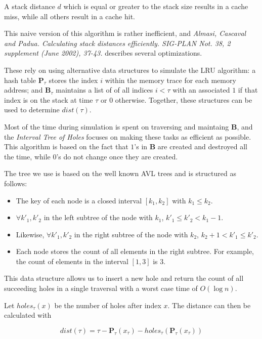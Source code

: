 \documentclass[a4paper,10pt]{article}
\begin{document}
A stack distance $d$ which is equal or greater to the stack size results
in a cache miss, while all others result in a cache hit.

This naive version of this algorithm is rather inefficient, and \emph{Almasi, Cascaval and Padua. Calculating stack distances efficiently. SIG-PLAN Not. 38, 2 supplement (June 2002), 37-43.} describes several optimizations.

These rely on using alternative data structures to simulate the LRU algorithm: a hash table $\mathbf{P}_\tau$ stores the index $i$ within the memory trace for each memory address; and $\mathbf{B}_\tau$ maintains a list of
of all indices $i < \tau$ with an associated $1$ if that index is on the stack at time $\tau$ or $0$ otherwise. Together, these structures can
be used to  determine $dist(\tau)$.

Most of the time during simulation is spent on traversing and maintaing $\mathbf{B}$, and the \emph{Interval Tree of Holes} focuses on making these tasks as efficient as possible. This algorithm is based on the fact that
$1$'s in $\mathbf{B}$ are created and destroyed all the time, while $0$'s
do not change once they are created.

The tree we use is based on the well known AVL trees and is structured
as follows:

\begin{itemize}
\item The key of each node is a closed interval $[k_1, k_2]$ with
      $k_1 \leq k_2$.
\item $\forall k'_1, k'_2$ in the left subtree of the node with $k_1$,          $k'_1 \leq k'_2 < k_1 - 1$.
\item Likewise, $\forall k'_1, k'_2$ in the right subtree of the node with $k_2$, $k_2 + 1 < k'_1 \leq k'_2$.
\item Each node stores the count of all elements
      in the right subtree. For example, the count of elements in the
      interval $[1, 3]$ is $3$.
\end{itemize}

This data structure allows us to insert a new hole and return the count
of all succeeding holes in a single traversal with a worst case
time of $O(\log n)$.

Let $holes_\tau(x)$ be the number of holes after index $x$. The distance
can then be calculated with

\begin{displaymath}
dist(\tau) = \tau - \mathbf{P}_\tau(x_\tau) - holes_\tau(\mathbf{P}_\tau(x_\tau))
\end{displaymath}
\end{document}
